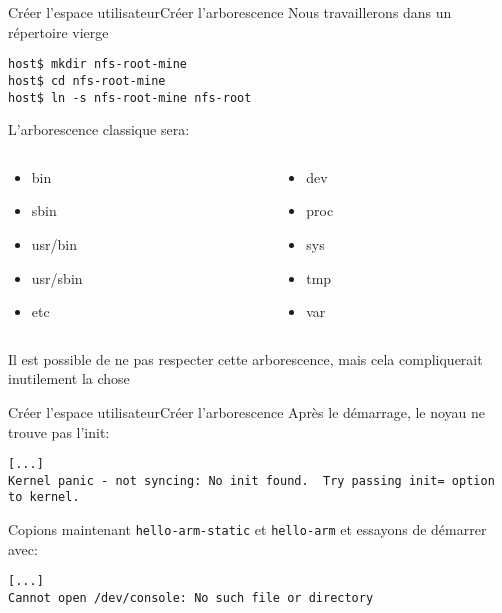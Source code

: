 \begin{frame}[fragile=singleslide]{Créer l'espace utilisateur}{Créer l'arborescence}
  Nous travaillerons dans un répertoire vierge
  \begin{lstlisting}
host$ mkdir nfs-root-mine
host$ cd nfs-root-mine
host$ ln -s nfs-root-mine nfs-root
  \end{lstlisting} %
  L'arborescence classique sera:
  \vspace{-2ex}
  \begin{columns}[onlytextwidth,t]
    \begin{column}[t]{0.5\textwidth}
      \begin{itemize}
      \item bin
      \item sbin
      \item usr/bin
      \item usr/sbin
      \item etc
      \end{itemize}
    \end{column}
    \begin{column}[t]{0.5\textwidth}
      \begin{itemize}
      \item dev
      \item proc
      \item sys
      \item tmp
      \item var
      \end{itemize}
    \end{column}
  \end{columns}
  \vspace{2ex}
  Il est possible de ne pas respecter cette arborescence, mais cela
  compliquerait inutilement la chose
\end{frame}

\begin{frame}[fragile=singleslide]{Créer l'espace utilisateur}{Créer l'arborescence}
  Après le démarrage, le noyau ne trouve pas l'init:
    \begin{lstlisting}
[...]
Kernel panic - not syncing: No init found.  Try passing init= option to kernel.
    \end{lstlisting}

    Copions maintenant  \verb+hello-arm-static+ et \verb+hello-arm+ et
    essayons de démarrer avec:
    \begin{lstlisting}
[...]
Cannot open /dev/console: No such file or directory
    \end{lstlisting}
\end{frame}

